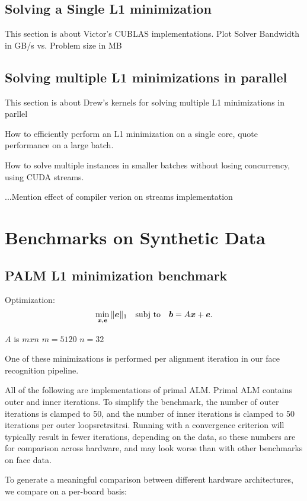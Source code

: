 \documentclass[10pt,twocolumn,letterpaper]{article}
\begin{document}
\subsection{Solving a Single L1 minimization}
This section is about Victor's CUBLAS implementations.
Plot Solver Bandwidth in GB/s vs. Problem size in MB

\subsection{Solving multiple L1 minimizations in parallel}
This section is about Drew's kernels for solving multiple L1 minimizations in parllel

How to efficiently perform an L1 minimization on a single core, quote performance on a large batch.

How to solve multiple instances in smaller batches without losing concurrency, using CUDA streams.

...Mention effect of compiler verion on streams implementation

\section{Benchmarks on Synthetic Data}
\subsection{PALM L1 minimization benchmark}

Optimization:
\begin{equation}
\min_{{\boldsymbol{x}}, \boldsymbol{e}} \|\boldsymbol{e}\|_1 \quad \textup{subj to} \quad \boldsymbol{b} = A {\boldsymbol{x}} + \boldsymbol{e}.
\end{equation}

$A$ is $mxn$
$m = 5120$
$n = 32$

One of these minimizations is performed per 
alignment iteration in our face recognition pipeline.

All of the following are implementations of primal ALM.
Primal ALM contains outer and inner iterations.
To simplify the benchmark, the number of outer iterations
is clamped to 50, and the number of inner iterations is
clamped to 50 iterations per outer loopsretrsitrsi.  Running with
a convergence criterion will typically result in fewer
iterations, depending on the data, so these numbers are
for comparison across hardware, and may look worse than
with other benchmarks on face data.

To generate a meaningful comparison between different hardware
architectures, we compare on a per-board basis:
\end{document}
